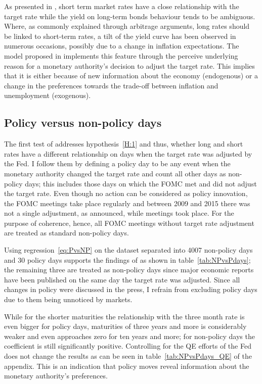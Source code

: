 
As presented in \textcite{Ellingsen.2003}, short term market rates have a close relationship with the target rate while the yield on long-term bonds behaviour tends to be ambiguous. Where, as commonly explained through arbitrage arguments, long rates should be linked to short-term rates, a tilt of the yield curve has been observed in numerous occasions, possibly due to a change in inflation expectations. The model proposed in \textcite{Ellingsen.2001} implements this feature through the perceive underlying reason for a monetary authority's decision to adjust the target rate. This implies that it is either because of new information about the economy (endogenous) or a change in the preferences towards the trade-off between inflation and unemployment (exogenous).

\subsection{Policy versus non-policy days}

The first test of \textcite{Ellingsen.2003} addresses hypothesis~\ref{H:1} and thus, whether long and short rates have a different relationship on days when the target rate was adjusted by the Fed. I follow them by defining a policy day to be any event when the monetary authority changed the target rate and count all other days as non-policy days; this includes those days on which the FOMC met and did not adjust the target rate. Even though no action can be considered as policy innovation, the FOMC meetings take place regularly and between 2009 and 2015 there was not a single adjustment, as announced, while meetings took place. For the purpose of coherence, hence, all FOMC meetings without target rate adjustment are treated as standard non-policy days. 

Using regression~\eqref{eq:PvsNP} on the dataset separated into 4007 non-policy days and 30 policy days supports the findings of \textcite{Ellingsen.2003} as shown in table~\vref{tab:NPvsPdays}; the remaining three are treated as non-policy days since major economic reports have been published on the same day the target rate was adjusted. Since all changes in policy were discussed in the press, I refrain from excluding policy days due to them being unnoticed by markets.

%
While for the shorter maturities the relationship with the three month rate is even bigger for policy days, maturities of three years and more is considerably weaker and even approaches zero for ten years and more; for non-policy days the coefficient is still significantly positive. Controlling for the QE efforts of the Fed does not change the results as can be seen in table~\vref{tab:NPvsPdays_QE} of the appendix.
This is an indication that policy moves reveal information about the monetary authority's preferences.

